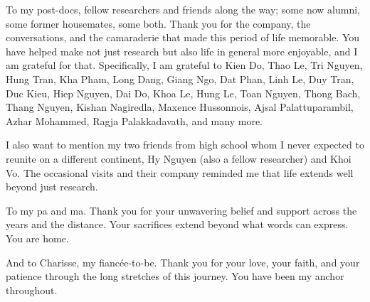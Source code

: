 \begin{foldable}
  To my post-docs, fellow researchers and friends along the way; some now alumni, some former housemates, some both.
  Thank you for the company, the conversations, and the camaraderie that made this period of life memorable.
  You have helped make not just research but also life in general more enjoyable, and I am grateful for that.
  Specifically, I am grateful to Kien Do, Thao Le, Tri Nguyen, Hung Tran, Kha Pham, Long Dang, Giang Ngo, Dat Phan, Linh Le, Duy Tran, Duc Kieu, Hiep Nguyen, Dai Do, Khoa Le, Hung Le, Toan Nguyen, Thong Bach, Thang Nguyen, Kishan Nagiredla, Maxence Hussonnois, Ajsal Palattuparambil, Azhar Mohammed, Ragja Palakkadavath, and many more.
\end{foldable}

\begin{foldable}
  I also want to mention my two friends from high school whom I never expected to reunite on a different continent, Hy Nguyen (also a fellow researcher) and Khoi Vo.
  The occasional visits and their company reminded me that life extends well beyond just research.
\end{foldable}

\begin{foldable}
  To my pa and ma.
  Thank you for your unwavering belief and support across the years and the distance.
  Your sacrifices extend beyond what words can express.
  You are home.
\end{foldable}

\begin{foldable}
  And to Charisse, my fiancée-to-be.
  Thank you for your love, your faith, and your patience through the long stretches of this journey.
  You have been my anchor throughout.
\end{foldable}
